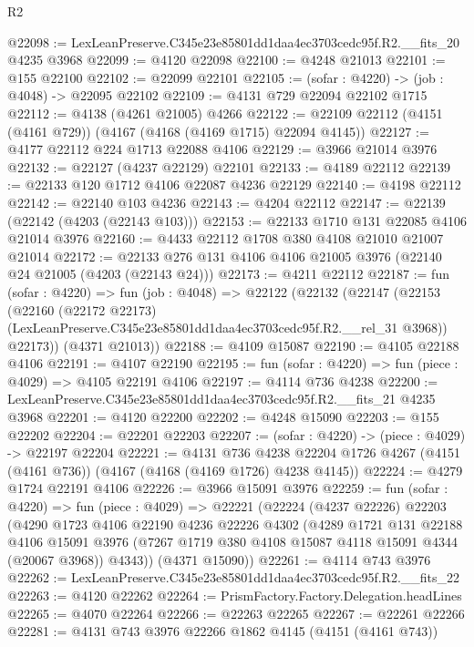 \begin{lexlean}{R2}
\begin{coremodule}
@22098 := LexLeanPreserve.C345e23e85801dd1daa4ec3703cedc95f.R2.__fits_20 @4235 @3968
@22099 := @4120 @22098
@22100 := @4248 @21013
@22101 := @155 @22100
@22102 := @22099 @22101
@22105 := (sofar : @4220) -> (job : @4048) -> @22095 @22102
@22109 := @4131 @729 @22094 @22102 @1715
@22112 := @4138 (@4261 @21005) @4266
@22122 := @22109 @22112 (@4151 (@4161 @729)) (@4167 (@4168 (@4169 @1715) @22094 @4145))
@22127 := @4177 @22112 @224 @1713 @22088 @4106
@22129 := @3966 @21014 @3976
@22132 := @22127 (@4237 @22129) @22101
@22133 := @4189 @22112
@22139 := @22133 @120 @1712 @4106 @22087 @4236 @22129
@22140 := @4198 @22112
@22142 := @22140 @103 @4236
@22143 := @4204 @22112
@22147 := @22139 (@22142 (@4203 (@22143 @103)))
@22153 := @22133 @1710 @131 @22085 @4106 @21014 @3976
@22160 := @4433 @22112 @1708 @380 @4108 @21010 @21007 @21014
@22172 := @22133 @276 @131 @4106 @4106 @21005 @3976 (@22140 @24 @21005 (@4203 (@22143 @24)))
@22173 := @4211 @22112
@22187 := fun (sofar : @4220) =>
  fun (job : @4048) =>
  @22122
    (@22132
      (@22147
        (@22153
          (@22160
            (@22172 @22173)
            (LexLeanPreserve.C345e23e85801dd1daa4ec3703cedc95f.R2.__rel_31 @3968))
          @22173))
      (@4371 @21013))
@22188 := @4109 @15087
@22190 := @4105 @22188 @4106
@22191 := @4107 @22190
@22195 := fun (sofar : @4220) => fun (piece : @4029) => @4105 @22191 @4106
@22197 := @4114 @736 @4238
@22200 := LexLeanPreserve.C345e23e85801dd1daa4ec3703cedc95f.R2.__fits_21 @4235 @3968
@22201 := @4120 @22200
@22202 := @4248 @15090
@22203 := @155 @22202
@22204 := @22201 @22203
@22207 := (sofar : @4220) -> (piece : @4029) -> @22197 @22204
@22221 := @4131
    @736
    @4238
    @22204
    @1726
    @4267
    (@4151 (@4161 @736))
    (@4167 (@4168 (@4169 @1726) @4238 @4145))
@22224 := @4279 @1724 @22191 @4106
@22226 := @3966 @15091 @3976
@22259 := fun (sofar : @4220) =>
  fun (piece : @4029) =>
  @22221
    (@22224
      (@4237 @22226)
      @22203
      (@4290
        @1723
        @4106
        @22190
        @4236
        @22226
        @4302
        (@4289
          @1721
          @131
          @22188
          @4106
          @15091
          @3976
          (@7267 @1719 @380 @4108 @15087 @4118 @15091 @4344 (@20067 @3968))
          @4343))
      (@4371 @15090))
@22261 := @4114 @743 @3976
@22262 := LexLeanPreserve.C345e23e85801dd1daa4ec3703cedc95f.R2.__fits_22
@22263 := @4120 @22262
@22264 := PrismFactory.Factory.Delegation.headLines
@22265 := @4070 @22264
@22266 := @22263 @22265
@22267 := @22261 @22266
@22281 := @4131
    @743
    @3976
    @22266
    @1862
    @4145
    (@4151 (@4161 @743))

\end{coremodule}
\end{lexlean}
